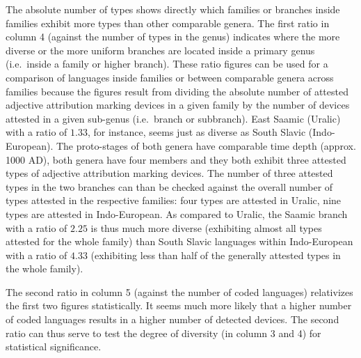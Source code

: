 The absolute number of types shows directly which families or branches inside families exhibit more types than other comparable genera. The first ratio in column 4 (against the number of types in the genus) indicates where the more diverse or the more uniform branches are located inside a primary genus (i.e.~inside a family or higher branch). These ratio figures can be used for a comparison of languages inside families or between comparable genera across families because the figures result from dividing the absolute number of attested adjective attribution marking devices in a given family by the number of devices attested in a given sub-genus (i.e.~branch or subbranch). East Saamic (Uralic) with a ratio of $1.33$, for instance, seems just as diverse as South Slavic (Indo-European). The proto-stages of both genera have comparable time depth (approx. 1000 AD), both genera have four members and they both exhibit three attested types of adjective attribution marking devices. The number of three attested types in the two branches can than be checked against the overall number of types attested in the respective families: four types are attested in Uralic, nine types are attested in Indo-European. As compared to Uralic, the Saamic branch with a ratio of $2.25$ is thus much more diverse (exhibiting almost all types attested for the whole family) than South Slavic languages within Indo-European with a ratio of $4.33$ (exhibiting less than half of the generally attested types in the whole family).

The second ratio in column 5 (against the number of coded languages) relativizes the first two figures statistically. It seems much more likely that a higher number of coded languages results in a higher number of detected devices. The second ratio can thus serve to test the degree of diversity (in column 3 and 4) for statistical significance. 


